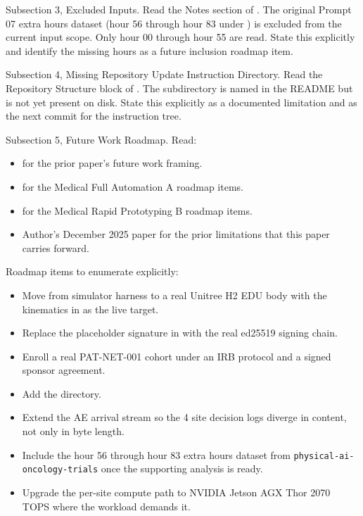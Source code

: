 \begin{sectionaccent}
Subsection 3, Excluded Inputs. Read the Notes section of
. The
original Prompt 07 extra hours dataset (hour 56 through hour 83 under
)
is excluded from the current input scope. Only hour 00 through hour
55 are read. State this explicitly and identify the missing hours as
a future inclusion roadmap item.

Subsection 4, Missing Repository Update Instruction Directory. Read
the Repository Structure block of
. The
 subdirectory is named in
the README but is not yet present on disk. State this explicitly as a
documented limitation and as the next commit for the instruction
tree.

Subsection 5, Future Work Roadmap. Read:
\begin{itemize}
  \item {}
        for the prior paper's future work framing.
  \item {}
        for the Medical Full Automation A roadmap items.
  \item {}
        for the Medical Rapid Prototyping B roadmap items.
  \item Author's December 2025 paper
         for the prior limitations
        that this paper carries forward.
\end{itemize}
Roadmap items to enumerate explicitly:
\begin{itemize}
  \item Move from simulator harness to a real Unitree H2 EDU body
        with the kinematics in
         as the live target.
  \item Replace the placeholder signature in
         with the real
        ed25519 signing chain.
  \item Enroll a real PAT-NET-001 cohort under an IRB protocol and a
        signed sponsor agreement.
  \item Add the
        directory.
  \item Extend the AE arrival stream so the 4 site decision logs
        diverge in content, not only in byte length.
  \item Include the hour 56 through hour 83 extra hours dataset from
        \texttt{physical-ai-oncology-trials} once the supporting
        analysis is ready.
  \item Upgrade the per-site compute path to NVIDIA Jetson AGX Thor
        2070 TOPS where the workload demands it.
\end{itemize}


\end{sectionaccent}

